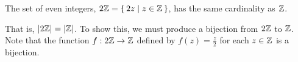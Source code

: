 \guard



\begin{exmp}
\label{exmp:evenIntegersHaveSameCardinalityAsIntegers}
  The set of even integers, $2\mathbb{Z}=\left\{\,2z\mid z\in\mathbb{Z}\,\right\}$, has the same cardinality as $\mathbb{Z}$.

  That is, $\vert 2\mathbb{Z}\vert = \vert\mathbb{Z}\vert$.
  To show this, we must produce a bijection from $2\mathbb{Z}$ to $\mathbb{Z}$.
  Note that the function $f:2\mathbb{Z}\to\mathbb{Z}$ defined by $f(z) = \frac{z}{2}$ for each $z\in\mathbb{Z}$ is a bijection.
\end{exmp}
